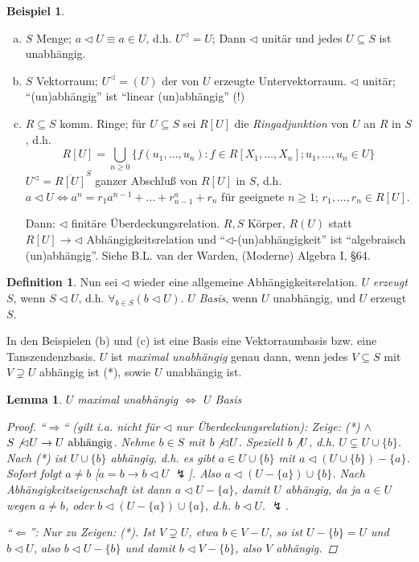 \documentclass[headsepline=true,DIV=11]{scrartcl}
\newtheorem*{lemma}{Lemma}
\theoremstyle{definition}
\newtheorem*{definition}{Definition}
\newtheorem*{example}{Beispiel}
\renewcommand{\bar}[1]{\overline{#1}}
\begin{document}
\begin{example}
	\begin{enumerate}[(a)]
		\item $S$ Menge; $a\lhd U \equiv a\in U$, d.h. $U^\lhd=U$; Dann $\lhd$ unitär und jedes $U\subseteq S$ ist unabhängig.
		\item $S$ Vektorraum; $U^\lhd=(U)$ der von $U$ erzeugte Untervektorraum. $\lhd$ unitär; ``(un)abhängig'' ist ``linear (un)abhängig'' (!)
		\item $R\subseteq S$ komm. Ringe; für $U\subseteq S$ sei $R[U]$ die {\em Ringadjunktion} von $U$ an $R$ in $S$, d.h.
			\[ R[U]= \bigcup_{n\ge 0} \{ f(u_1,\ldots,u_n)\colon f\in R[X_1,\ldots,X_n]; u_1,\ldots, u_n \in U\} \]
			$U^\lhd = \bar{ R[U] }^S$ ganzer Abschluß von $R[U]$ in $S$, d.h. $a\lhd U\iff a^n = r_1a^{n-1}+\ldots+r_{n-1}^a + r_n$ für geeignete $n\ge 1$; $r_1,\ldots,r_n\in R[U]$.
			
			Dann: $\lhd$ finitäre Überdeckungsrelation.
			$R, S$ Körper, $R(U)$ statt $R[U]\to \lhd$ Abhängigkeitsrelation und ``$\lhd$-(un)abhängigkeit'' ist ``algebraisch (un)abhängig''.
			Siehe B.L. van der Warden, (Moderne) Algebra I, §64.
	\end{enumerate}
\end{example}

\begin{definition}
	Nun sei $\lhd$ wieder eine allgemeine Abhängigkeitsrelation.
	$U$ {\em erzeugt} $S$, wenn $S\lhd U$, d.h. $\forall_{b\in S}(b\lhd U)$.
	$U$ {\em Basis}, wenn $U$ unabhängig, und $U$ erzeugt $S$.
	
	In den Beispielen (b) und (c) ist eine Basis eine Vektorraumbasis bzw. eine Tanszendenzbasis.
	$U$ ist {\em maximal unabhängig} genau dann, wenn jedes $V\subseteq S$ mit $V\supsetneq U$ abhängig ist (*), sowie $U$ unabhängig ist.
\end{definition}

\begin{lemma}
	$U$ maximal unabhängig $\iff$ $U$ Basis
	\begin{proof}
		``$\Rightarrow$`` (gilt i.a. nicht für $\lhd$ nur Überdeckungsrelation):
		Zeige: (*) $\land$ $S\not\lhd U \to U \text{ abhängig}$.
		Nehme $b\in S$ mit $b\not\lhd U$.
		Speziell $b\not\it U$, d.h. $U\subsetneq U\cup \{b\}$.
		Nach (*) ist $U\cup \{b\}$ abhängig, d.h. es gibt $a\in U\cup \{b\}$ mit $a\lhd (U\cup \{b\})-\{a\}$.
		Sofort folgt $a\neq b$ [$a=b\to b\lhd U$ $\lightning$].
		Also $a\lhd (U-\{a\})\cup\{b\}$.
		Nach Abhängigkeitseigenschaft ist dann $a\lhd U-\{a\}$, damit $U$ abhängig, da ja $a\in U$ wegen $a\neq b$, 
		oder $b\lhd (U-\{a\})\cup\{a\}$, d.h. $b\lhd U$. $\lightning$.

		``$\Leftarrow$'': Nur zu Zeigen: (*).
		Ist $V\supsetneq U$, etwa $b\in V-U$, so ist $U-\{b\}=U$ und $b\lhd U$, also $b\lhd U-\{b\}$ und damit $b\lhd V-\{b\}$, also $V$ abhängig.
	\end{proof}
\end{lemma}
\end{document}
